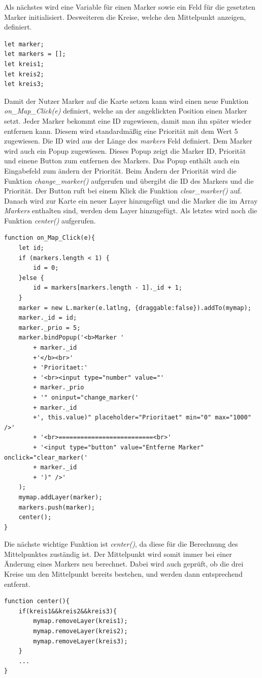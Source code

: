 \documentclass[a4paper, twoside, 12pt]{scrreprt}
\begin{document}
Als nächstes wird eine Variable für einen Marker sowie ein Feld für die gesetzten Marker initialisiert.
Desweiteren die Kreise, welche den Mittelpunkt anzeigen, definiert.
\begin{lstlisting}
let marker;
let markers = [];
let kreis1;
let kreis2;
let kreis3;
\end{lstlisting}
Damit der Nutzer Marker auf die Karte setzen kann wird einen neue Funktion \textit{on\_Map\_Click(e)} definiert, welche an der angeklickten Position einen Marker setzt.
Jeder Marker bekommt eine ID zugewiesen, damit man ihn später wieder entfernen kann.
Diesem wird standardmäßig eine Priorität mit dem Wert 5 zugewiesen.
Die ID wird aus der Länge des \textit{markers} Feld definiert.
Dem Marker wird auch ein Popup zugewiesen.
Dieses Popup zeigt die Marker ID, Priorität und einene Button zum entfernen des Markers.
Das Popup enthält auch ein Eingabefeld zum ändern der Priorität.
Beim Ändern der Priorität wird die Funktion \textit{change}\_\textit{marker()} aufgerufen und übergibt die ID des Markers und die Priorität.
Der Button ruft bei einem Klick die Funktion \textit{clear}\_\textit{marker()} auf.
Danach wird zur Karte ein neuer Layer hinzugefügt und die Marker die im Array \textit{Markers} enthalten sind, werden dem Layer hinzugefügt.
Als letztes wird noch die Funktion \textit{center()} aufgerufen.
\begin{lstlisting}
function on_Map_Click(e){
	let id;
	if (markers.length < 1) {
		id = 0;
	}else {
		id = markers[markers.length - 1]._id + 1;
	}
	marker = new L.marker(e.latlng, {draggable:false}).addTo(mymap);
	marker._id = id;
	marker._prio = 5;
	marker.bindPopup('<b>Marker '
		+ marker._id
		+'</b><br>'
    	+ 'Prioritaet:'
		+ '<br><input type="number" value="'
		+ marker._prio
		+ '" oninput="change_marker('
		+ marker._id
		+', this.value)" placeholder="Prioritaet" min="0" max="1000" />'
		+ '<br>==========================<br>'
		+ '<input type="button" value="Entferne Marker" onclick="clear_marker('
		+ marker._id
		+ ')" />'
	);
	mymap.addLayer(marker);
	markers.push(marker);
	center();
}
\end{lstlisting}
Die nächste wichtige Funktion ist \textit{center()}, da diese für die Berechnung des Mittelpunktes zuständig ist.
Der Mittelpunkt wird somit immer bei einer Änderung eines Markers neu berechnet.
Dabei wird auch geprüft, ob die drei Kreise um den Mittelpunkt bereits bestehen, und werden dann entsprechend entfernt.
\begin{lstlisting}
function center(){
	if(kreis1&&kreis2&&kreis3){
		mymap.removeLayer(kreis1);
		mymap.removeLayer(kreis2);
		mymap.removeLayer(kreis3);
	}
	...
}
\end{lstlisting}
\end{document}
